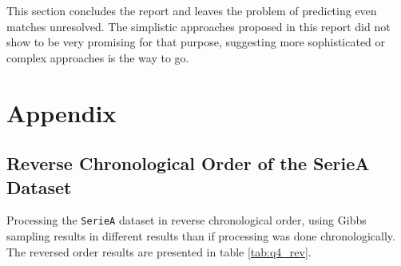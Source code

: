 \documentclass{article}
\begin{document}
	This section concludes the report and leaves the problem of predicting even matches unresolved. The simplistic approaches proposed in this report did not show to be very promising for that purpose, suggesting more sophisticated or complex approaches is the way to go. 
	\section*{Appendix}

	\subsection{Reverse Chronological Order of the SerieA Dataset}\label{app:reverse_gibbs}
	Processing the \texttt{SerieA} dataset in reverse chronological order, using Gibbs sampling results in different results than if processing was done chronologically. The reversed order results are presented in table \ref{tab:q4_rev}.
	
\end{document}
